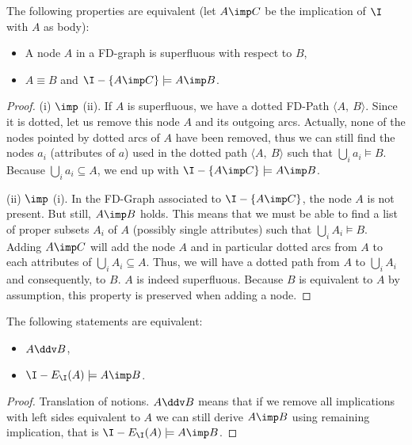 \begin{proposition} \label{prop:maier.equiv_sup_sub} The following properties
are equivalent (let $A \imp C$ be the implication of $\I$ with $A$ as
body):
\begin{itemize}
	\item[(i)] A node $A$ in a FD-graph is superfluous with respect to $B$,
	\item[(ii)] $A \equiv B$ and $\I - \{A \imp C \} \models A \imp B$.
\end{itemize}
\end{proposition}

\begin{proof} (i) $\imp$ (ii). If $A$ is superfluous, we have a dotted FD-Path
$\langle A, \ B \rangle$. Since it is dotted, let us remove this node $A$ and
its outgoing arcs. Actually, none of the nodes pointed by dotted arcs of $A$
have been removed, thus we can still find the nodes $a_i$ (attributes of $a$) 
used in the dotted path $\langle A, \ B \rangle$ such that $\bigcup_i a_i 
\models B$. Because $\bigcup_i a_i \subseteq A$, we end up with $\I - \{A \imp 
C \} \models A \imp B$.

\vspace{1.2em}

(ii) $\imp$ (i). In the FD-Graph associated to $\I - \{A \imp C \}$, the node 
$A$ is not present. But still, $A \imp B$ holds. This means that we must be
able to find a list of proper subsets $A_i$ of $A$ (possibly single attributes)
such that $\bigcup_{i} A_i \models B$. Adding $A \imp C$ will add the node $A$
and in particular dotted arcs from $A$ to each attributes of $\bigcup_{i} A_i 
\subseteq A$. Thus, we will have a dotted path from $A$ to $\bigcup_{i} A_i$ and
consequently, to $B$. $A$ is indeed superfluous. Because $B$ is equivalent to 
$A$ by assumption, this property is preserved when adding a node.

\end{proof}

\begin{proposition} \label{prop:maier.equiv_dd_sub} The following statements 
are equivalent:
\begin{itemize}
	\item[(i)] $A\ddv B$,
	\item[(ii)] $\I - E_{\I}(A) \models A \imp B$.
\end{itemize}
	
\end{proposition}

\begin{proof}
Translation of notions. $A \ddv B$ means that if we remove all implications
with left sides equivalent to $A$ we can still derive $A \imp B$ using remaining
implication, that is $\I - E_{\I}(A) \models A \imp B$.
\end{proof}

